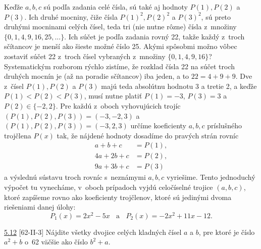 \rie Keďže $a, b, c$ sú podľa zadania celé čísla, sú také aj hodnoty $P(1), P(2)$ a $P(3)$. Ich druhé mocniny, čiže čísla  $P(1)^2 , P(2)^2$ a $P(3)^2$, sú preto druhými mocninami
celých čísel, teda tri (nie nutne rôzne) čísla z~množiny $\{0, 1, 4, 9, 16, 25, . . .\}$. Ich súčet je podľa zadania rovný 22, takže každý z~troch sčítancov je menší ako šieste možné číslo 25. Akými spôsobmi možno vôbec zostaviť súčet 22 z~troch čísel vybraných z~množiny  $\{0, 1, 4, 9, 16\}$?
Systematickým rozborom rýchlo zistíme, že rozklad čísla 22 na súčet troch druhých mocnín je (až na poradie sčítancov) iba jeden, a to $22 = 4+9+9$. Dve z~čísel $P(1), P(2)$ a $P(3)$ majú teda absolútnu hodnotu 3 a tretie 2, a keďže
$P(1) < P(2) < P(3)$, musí nutne platiť $P(1) = -3$, $P(3) = 3$ a $P(2) \in \{-2, 2\}$. Pre každú z~oboch vyhovujúcich
trojíc $(P(1), P(2), P(3)) = (-3, -2, 3)$ a $(P(1), P(2), P(3)) = (-3, 2, 3)$ určíme koeficienty $a, b, c$ príslušného trojčlena $P(x)$ tak, že nájdené hodnoty dosadíme do pravých strán rovníc
\begin{align*}
a + b + c &= P(1),\\
4a + 2b + c &= P(2),\\
9a + 3b + c &= P(3)
\end{align*}
a výslednú sústavu troch rovníc s~neznámymi $a, b, c$ vyriešime. Tento jednoduchý výpočet tu vynecháme, v~oboch prípadoch vyjdú celočíselné trojice $(a, b, c)$, ktoré zapíšeme rovno ako koeficienty trojčlenov, ktoré sú jedinými dvoma riešeniami danej úlohy:
$$P_1(x) = 2x^2 -5x \ \ \ \  \text{a} \ \ \ \ P_2 (x) = -2x^2+ 11x -12.$$
\begin{tcolorbox}[breakable,notitle,boxrule=0pt,colback=light-gray,colframe=light-gray]\ul{5.12} [62-II-3]
Nájdite všetky dvojice celých kladných čísel $a$ a $b$, pre ktoré je číslo $a^2 +b$ o~62 väčšie
ako číslo $b^2 + a$.

\end{tcolorbox}

